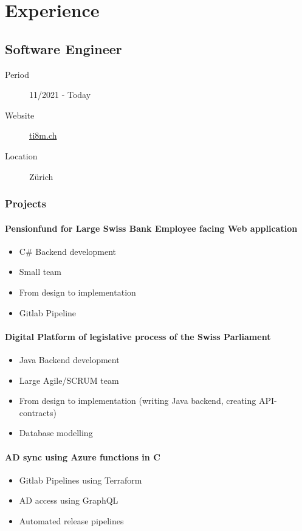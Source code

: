 \section{Experience}
\subsection{Software Engineer}
\begin{description}
    \item[Period] 11/2021 - Today
    \item[Website] \href{https://ti8m.ch}{ti8m.ch}
    \item[Location] Zürich
\end{description}

\subsubsection{Projects}

\paragraph{Pensionfund for Large Swiss Bank Employee facing Web application}
\begin{itemize}
    \item C\# Backend development
    \item Small team
    \item From design to implementation
    \item Gitlab Pipeline
\end{itemize}

\paragraph{Digital Platform of legislative process of the Swiss Parliament}
\begin{itemize}
    \item Java Backend development
    \item Large Agile/SCRUM team
    \item From design to implementation (writing Java backend, creating API-contracts)
    \item Database modelling
\end{itemize}

\paragraph{AD sync using Azure functions in C}
\begin{itemize}
    \item Gitlab Pipelines using Terraform
    \item AD access using GraphQL
    \item Automated release pipelines
\end{itemize}
